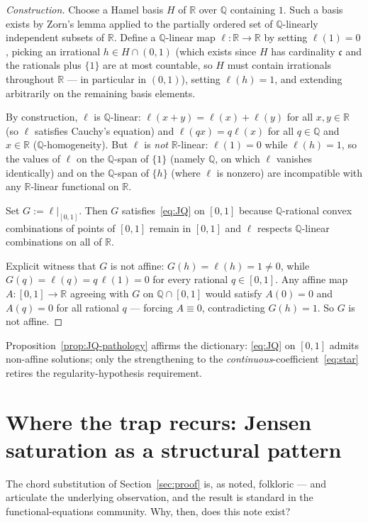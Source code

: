 \documentclass[review,12pt,a4paper]{elsarticle}
\theoremstyle{remark}
\newcommand{\R}{\mathbb R}
\newcommand{\Q}{\mathbb Q}
\begin{document}
\begin{proof}[Construction]
Choose a Hamel basis $H$ of $\R$ over $\Q$ containing $1$. Such a basis
exists by Zorn's lemma applied to the partially ordered set of
$\Q$-linearly independent subsets of $\R$. Define a $\Q$-linear map
$\ell\colon\R\to\R$ by setting $\ell(1)=0$, picking an irrational $h\in
H\cap(0,1)$ (which exists since $H$ has cardinality $\mathfrak c$ and the
rationals plus $\{1\}$ are at most countable, so $H$ must contain
irrationals throughout $\R$ --- in particular in $(0,1)$), setting
$\ell(h)=1$, and extending arbitrarily on the remaining basis elements.

By construction, $\ell$ is $\Q$-linear: $\ell(x+y)=\ell(x)+\ell(y)$ for
all $x,y\in\R$ (so $\ell$ satisfies Cauchy's equation) and
$\ell(qx)=q\ell(x)$ for all $q\in\Q$ and $x\in\R$ ($\Q$-homogeneity). But
$\ell$ is \emph{not} $\R$-linear: $\ell(1)=0$ while $\ell(h)=1$, so the
values of $\ell$ on the $\Q$-span of $\{1\}$ (namely $\Q$, on which $\ell$
vanishes identically) and on the $\Q$-span of $\{h\}$ (where $\ell$ is
nonzero) are incompatible with any $\R$-linear functional on $\R$.

Set $G:=\ell|_{[0,1]}$. Then $G$ satisfies~\eqref{eq:JQ} on $[0,1]$
because $\Q$-rational convex combinations of points of $[0,1]$ remain in
$[0,1]$ and $\ell$ respects $\Q$-linear combinations on all of $\R$.

Explicit witness that $G$ is not affine: $G(h)=\ell(h)=1\ne 0$, while
$G(q)=\ell(q)=q\,\ell(1)=0$ for every rational $q\in[0,1]$. Any affine map
$A\colon[0,1]\to\R$ agreeing with $G$ on $\Q\cap[0,1]$ would satisfy
$A(0)=0$ and $A(q)=0$ for all rational $q$ --- forcing $A\equiv 0$,
contradicting $G(h)=1$. So $G$ is not affine.
\end{proof}

Proposition~\ref{prop:JQ-pathology} affirms the dictionary: \eqref{eq:JQ}
on $[0,1]$ admits non-affine solutions; only the strengthening to the
\emph{continuous}-coefficient~\eqref{eq:star} retires the
regularity-hypothesis requirement.

\section{Where the trap recurs: Jensen saturation as a structural pattern}
\label{sec:recurrence}

The chord substitution of Section~\ref{sec:proof} is, as noted, folkloric
--- \cite[\S2.1]{Aczel1966} and \cite[Ch.~13]{Kuczma2009} articulate the
underlying observation, and the result is standard in the
functional-equations community. Why, then, does this note exist?
\end{document}
